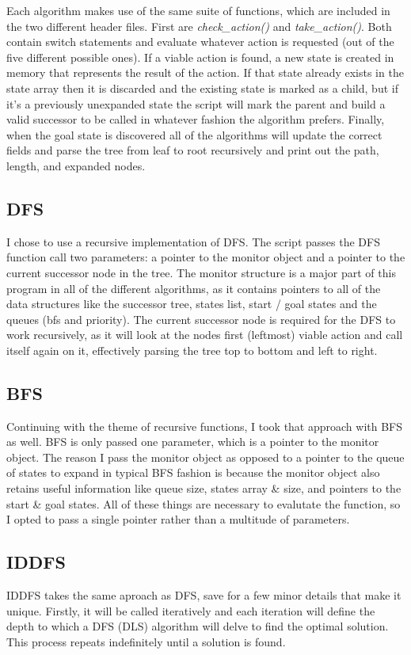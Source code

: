 \documentclass[10pt,draftclsnofoot,onecolumn]{IEEEtran}
\begin{document}
Each algorithm makes use of the same suite of functions, which are included in the two different header files.
First are \textit{check\_action()} and \textit{take\_action()}.
Both contain switch statements and evaluate whatever action is requested (out of the five different possible ones).
If a viable action is found, a new state is created in memory that represents the result of the action.
If that state already exists in the state array then it is discarded and the existing state is marked as a child, but if it's a previously unexpanded state the script will mark the parent and build a valid successor to be called in whatever fashion the algorithm prefers.
Finally, when the goal state is discovered all of the algorithms will update the correct fields and parse the tree from leaf to root recursively and print out the path, length, and expanded nodes.


\subsection{DFS}
I chose to use a recursive implementation of DFS.
The script passes the DFS function call two parameters: a pointer to the monitor object and a pointer to the current successor node in the tree.
The monitor structure is a major part of this program in all of the different algorithms, as it contains pointers to all of the data structures like the successor tree, states list, start / goal states and the queues (bfs and priority).
The current successor node is required for the DFS to work recursively, as it will look at the nodes first (leftmost) viable action and call itself again on it, effectively parsing the tree top to bottom and left to right.

\subsection{BFS}
Continuing with the theme of recursive functions, I took that approach with BFS as well.
BFS is only passed one parameter, which is a pointer to the monitor object.
The reason I pass the monitor object as opposed to a pointer to the queue of states to expand in typical BFS fashion is because the monitor object also retains useful information like queue size, states array \& size, and pointers to the start \& goal states.
All of these things are necessary to evalutate the function, so I opted to pass a single pointer rather than a multitude of parameters.

\subsection{IDDFS}
IDDFS takes the same aproach as DFS, save for a few minor details that make it unique.
Firstly, it will be called iteratively and each iteration will define the depth to which a DFS (DLS) algorithm will delve to find the optimal solution.
This process repeats indefinitely until a solution is found.
\end{document}
